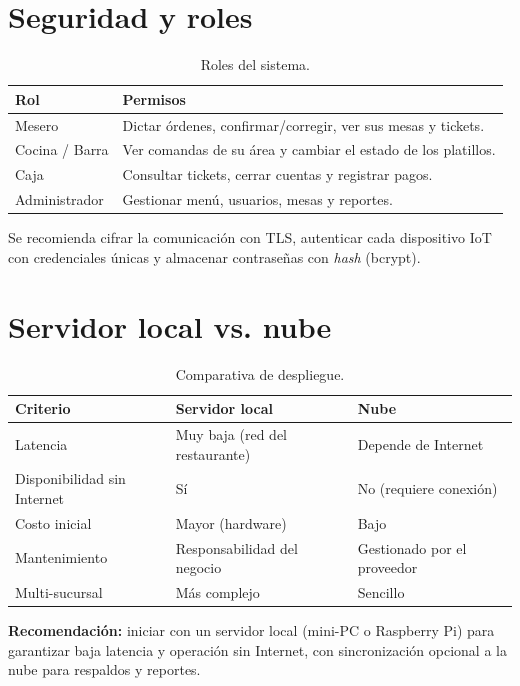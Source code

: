 \documentclass[11pt,letterpaper]{article}
\newcommand{\tabhead}[1]{\textbf{\color{white}#1}}
\newcommand{\encabezado}{\rowcolor{azulprincipal}}
\begin{document}
\section{Seguridad y roles}
\begin{table}[h!]
\centering
\begin{tabularx}{\textwidth}{l X}
\toprule
\encabezado \tabhead{Rol} & \tabhead{Permisos} \\
\midrule
Mesero & Dictar órdenes, confirmar/corregir, ver sus mesas y tickets. \\
Cocina / Barra & Ver comandas de su área y cambiar el estado de los platillos. \\
Caja & Consultar tickets, cerrar cuentas y registrar pagos. \\
Administrador & Gestionar menú, usuarios, mesas y reportes. \\
\bottomrule
\end{tabularx}
\caption{Roles del sistema.}
\end{table}

Se recomienda cifrar la comunicación con TLS, autenticar cada dispositivo IoT con credenciales únicas y almacenar contraseñas con \textit{hash} (bcrypt).

\section{Servidor local vs. nube}
\begin{table}[h!]
\centering
\begin{tabularx}{\textwidth}{l X X}
\toprule
\encabezado \tabhead{Criterio} & \tabhead{Servidor local} & \tabhead{Nube} \\
\midrule
Latencia & Muy baja (red del restaurante) & Depende de Internet \\
Disponibilidad sin Internet & Sí & No (requiere conexión) \\
Costo inicial & Mayor (hardware) & Bajo \\
Mantenimiento & Responsabilidad del negocio & Gestionado por el proveedor \\
Multi-sucursal & Más complejo & Sencillo \\
\bottomrule
\end{tabularx}
\caption{Comparativa de despliegue.}
\end{table}

\noindent\textbf{Recomendación:} iniciar con un servidor local (mini-PC o Raspberry Pi) para garantizar baja latencia y operación sin Internet, con sincronización opcional a la nube para respaldos y reportes.
\end{document}
